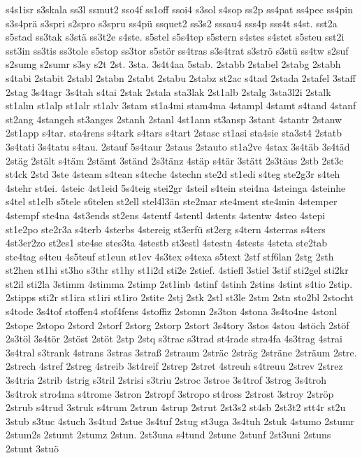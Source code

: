 {s4s1isr
s3skala
ss3l
ssmut2
sso4f
ss1off
ssoi4
s3sol
s4sop
ss2p
ss4pat
ss4pec
ss4pin
s3s4prä
s3spri
s2spro
s3spru
ss4pü
ssquet2
ss3s2
sssau4
sss4p
sss4t
s4st.
sst2a
s5stad
ss3tak
s3stä
ss3t2e
s4ste.
s5stel
s5s4tep
s5stern
s4stes
s4stet
s5steu
sst2i
sst3in
ss3tis
ss3tole
s5stop
ss3tor
s5stör
ss4tras
s3s4trat
s3strö
s3stü
ss4tw
s2suf
s2sumg
s2sumr
s3sy
s2t
2st.
3sta.
3s4t4aa
5stab.
2stabb
2stabel
2stabg
2stabh
s4tabi
2stabit
2stabl
2stabn
2stabt
2stabu
2stabz
st2ac
s4tad
2stada
2stafel
3staff
2stag
3s4tagr
3s4tah
s4tai
2stak
2stala
sta3lak
2st1alb
2stalg
3sta3l2i
2stalk
st1alm
st1alp
st1alr
st1alv
3stam
st1a4mi
stam4ma
4stampl
4stamt
s4tand
4stanf
st2ang
4stangeh
st3anges
2stanh
2stanl
4st1ann
st3ansp
3stant
4stantr
2stanw
2st1app
s4tar.
sta4rens
s4tark
s4tars
s4tart
2stasc
st1asi
sta4sie
sta3st4
2statb
3s4tati
3s4tatu
s4tau.
2stauf
5s4taur
2staus
2stauto
st1a2ve
4stax
3s4täb
3s4täd
2stäg
2stält
s4täm
2stämt
3ständ
2s3tänz
4stäp
s4tär
3stätt
2s3täus
2stb
2st3c
st4ck
2std
3ste
4steam
s4tean
s4teche
4stechn
ste2d
st1edi
s4teg
ste2g3r
s4teh
4stehr
st4ei.
4steic
4st1eid
5s4teig
stei2gr
4steil
s4tein
stei4na
4steinga
4steinhe
s4tel
st1elb
s5tele
s6telen
st2ell
stel4l3än
ste2mar
ste4ment
ste4min
4stemper
4stempf
ste4na
4st3ends
st2ens
4stentf
4stentl
4stents
4stentw
4steo
4stepi
st1e2po
ste2r3a
s4terb
4sterbs
4stereig
st3erfü
st2erg
s4tern
4sterras
s4ters
4st3er2zo
st2es1
ste4se
stes3ta
4stestb
st3estl
4stestn
4stests
4steta
ste2tab
ste4tag
s4teu
4s5teuf
st1eun
st1ev
4s3tex
s4texa
s5text
2stf
stf6lan
2stg
2sth
st2hen
st1hi
st3ho
s3thr
st1hy
st1i2d
sti2e
2stief.
4stiefl
3stiel
3stif
sti2gel
sti2kr
st2il
sti2la
3stimm
4stimma
2stimp
2st1inb
4stinf
4stinh
2stins
4stint
s4tio
2stip.
2stipps
sti2r
st1ira
st1iri
st1iro
2stite
2stj
2stk
2stl
st3le
2stm
2stn
sto2bl
2stocht
s4tode
3s4tof
stoffen4
stof4fens
4stoffiz
2stomn
2s3ton
4stona
3s4to4ne
4stonl
2stope
2stopo
2stord
2storf
2storg
2storp
2stort
3s4tory
3stos
4stou
4stöch
2stöf
2s3töl
3s4tör
2stöst
2stöt
2stp
2stq
s3trac
s3trad
st4rade
stra4fa
4s3trag
4strai
3s4tral
s3trank
4strans
3stras
3straß
2straum
2sträc
2sträg
2sträne
2sträum
2stre.
2strech
4stref
2streg
4streib
3st4reif
2strep
2stret
4streuh
s4treuu
2strev
2strez
3s4tria
2strib
4strig
s3tril
2strisi
s3triu
2stroc
3stroe
3s4trof
3strog
3s4troh
3s4trok
stro4ma
s4trome
3stron
2stropf
3stropo
st4ross
2strost
3stroy
2ströp
2strub
s4trud
3struk
s4trum
2strun
4strup
2strut
2st3s2
st4sb
2st3t2
stt4r
st2u
3stub
s3tuc
4stuch
3s4tud
2stue
3s4tuf
2stug
st3uga
3s4tuh
2stuk
4stumo
2stumr
2stum2s
2stumt
2stumz
2stun.
2st3una
s4tund
2stune
2stunf
2st3uni
2stuns
2stunt
3stuö
}
